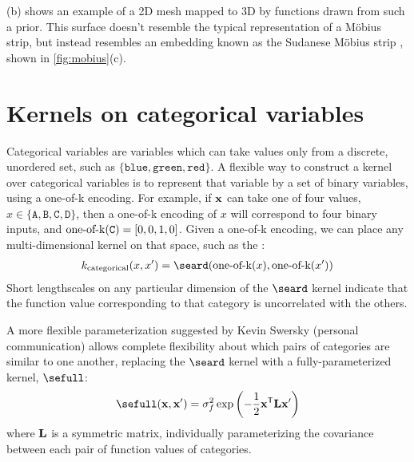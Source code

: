 %
(b) shows an example of a 2D mesh mapped to 3D by functions drawn from such a prior.
This surface doesn't resemble the typical representation of a M\"{o}bius strip,
but instead resembles an embedding known as the Sudanese M\"{o}bius strip \citep{sudanese1984}, shown in \cref{fig:mobius}(c).




\section{Kernels on categorical variables}



Categorical variables are variables which can take values only from a discrete, unordered set, such as $\{\texttt{blue}, \texttt{green}, \texttt{red}\}$.
A flexible way to construct a kernel over categorical variables is to represent that variable by a set of binary variables, using a one-of-k encoding.
For example, if ${\bf{x}}$ can take one of four values, $x \in \{ \texttt{A}, \texttt{B}, \texttt{C}, \texttt{D}\}$, then a one-of-k encoding of $x$ will correspond to four binary inputs, and $\operatorname{one-of-k}(\texttt{C}) = [0, 0, 1, 0]$.
Given a one-of-k encoding, we can place any multi-dimensional kernel on that space, such as the \seard{}:
%
\begin{align}
k_{\textnormal{categorical}}( x, x') = \seard( \oneofk(x), \oneofk(x') )
\end{align}
%
Short lengthscales on any particular dimension of the $\seard$ kernel indicate that the function value corresponding to that category is uncorrelated with the others.

A more flexible parameterization suggested by 
Kevin Swersky (personal communication) allows complete flexibility about which pairs of categories are similar to one another, replacing the $\seard$ kernel with a fully-parameterized kernel, $\sefull$:
%
\begin{align}
\sefull( \vx, \vx') = \sigma^2_f \exp \left( -\frac{1}{2} \vx\tra \vL \vx' \right)
\end{align}
%
where $\mathbf{L}$ is a symmetric matrix, individually parameterizing the covariance between each pair of function values of categories.

